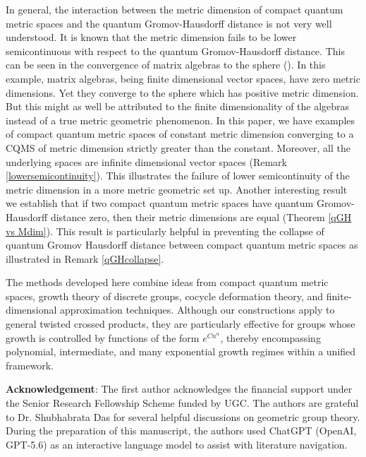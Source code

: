 \documentclass[a4paper,11pt,reqno]{amsart}
\theoremstyle{plain}
\theoremstyle{mainthmstyle}
\theoremstyle{named}
\numberwithin{equation}{section}
\begin{document}
In general, the interaction between the metric dimension of compact quantum metric spaces and the quantum Gromov-Hausdorff distance is not very well understood. It is known that the metric dimension fails to be lower semicontinuous with respect to the quantum Gromov-Hausdorff distance. This can be seen in the convergence of matrix algebras to the sphere (\cite{Rieffel-Sphere}). In this example, matrix algebras, being finite dimensional vector spaces, have zero metric dimensions. Yet they converge to the sphere which has positive metric dimension. But this might as well be attributed to the finite dimensionality of the algebras instead of a true metric geometric phenomenon. In this paper, we have examples of compact quantum metric spaces of constant metric dimension converging to a CQMS of metric dimension strictly greater than the constant. Moreover, all the underlying spaces are infinite dimensional vector spaces (Remark \ref{lowersemicontinuity}). This illustrates the failure of lower semicontinuity of the metric dimension in a more metric geometric set up. Another interesting result we establish that if two compact quantum metric spaces have quantum Gromov-Hausdorff distance zero, then their metric dimensions are equal (Theorem \ref{qGH vs Mdim}). This result is particularly helpful in preventing the collapse of quantum Gromov Hausdorff distance between compact quantum metric spaces as illustrated in Remark \ref{qGHcollapse}. 


The methods developed here combine ideas from compact quantum metric spaces, growth theory of discrete groups, cocycle deformation theory, and finite-dimensional approximation techniques. Although our constructions apply to general twisted crossed products, they are particularly effective for groups whose growth is controlled by functions of the form $e^{Cn^\alpha}$, thereby encompassing polynomial, intermediate, and many exponential growth regimes within a unified framework.

\vspace{2mm}

{\bf Acknowledgement}: The first author acknowledges the financial support under the Senior Research Fellowship Scheme funded by UGC. The authors are grateful to Dr. Shubhabrata Das for several helpful discussions on geometric group theory. During the preparation of this manuscript, the authors used ChatGPT (OpenAI, GPT-5.6) as an interactive language model to assist with literature navigation. 

\end{document}
